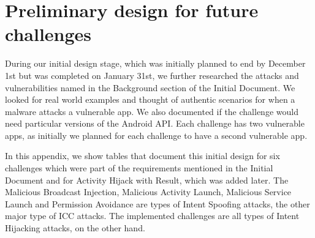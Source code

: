 \chapter{Preliminary design for future challenges}
\label{app:challenge_design}

During our initial design stage, which was initially planned to end by December 1st but was completed on January 31st, we further researched the attacks and vulnerabilities named in the Background section of the Initial Document. We looked for real world examples and thought of authentic scenarios for when a malware attacks a vulnerable app. We also documented if the challenge would need particular versions of the Android API. Each challenge has two vulnerable apps, as initially we planned for each challenge to have a second vulnerable app.

In this appendix, we show tables that document this initial design for six challenges which were part of the requirements mentioned in the Initial Document and for Activity Hijack with Result, which was added later. The Malicious Broadcast Injection, Malicious Activity Launch, Malicious Service Launch and Permission Avoidance are types of Intent Spoofing attacks, the other major type of ICC attacks. The implemented challenges are all types of Intent Hijacking attacks, on the other hand.

